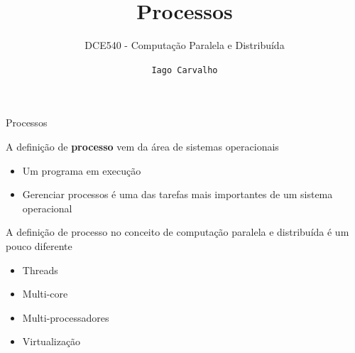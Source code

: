 \documentclass[compress]{beamer}
\title{Processos}
\subtitle{DCE540 - Computação Paralela e Distribuída}
\author{\texttt{Iago Carvalho}}
\institute{\texttt{Departamento de Ciência da Computação}}
\begin{document}
\begin{frame}
\titlepage

\end{frame}


\begin{frame}{Processos}

A definição de \textbf{processo} vem da área de sistemas operacionais
\begin{itemize}
    \item Um programa em execução
    \item Gerenciar processos é uma das tarefas mais importantes de um sistema operacional
\end{itemize}

\vspace{0.5cm}

A definição de processo no conceito de computação paralela e distribuída é um pouco diferente
\begin{itemize}
    \item Threads
    \item Multi-core
    \item Multi-processadores
    \item Virtualização
\end{itemize}






\end{frame}

\end{document}
